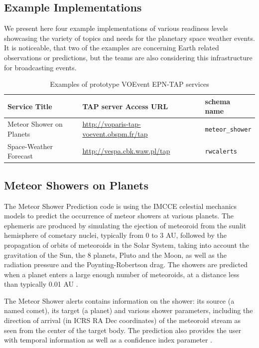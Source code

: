 \documentclass[referee,a4paper,12pt,traditabstract]{swsc}
\begin{document}
\begin{linenumbers}
\section{Example Implementations}

We present here four example implementations of various readiness levels showcasing the variety of topics and needs for the planetary space weather events. It is noticeable, that two of the examples are concerning Earth related observations or predictions, but the teams are also considering this infrastructure for broadcasting events.

\begin{table}
\begin{tabular}{lll}
Service Title&TAP server Access URL&schema name\\
\hline
Meteor Shower on Planets & \url{http://voparis-tap-voevent.obspm.fr/tap} & {\tt meteor\_shower}\\
Space-Weather Forecast & \url{http://vespa.cbk.waw.pl/tap} & {\tt rwcalerts}\\
\end{tabular}
\caption{Examples of prototype VOEvent EPN-TAP services}
\label{tab-services}
\end{table}

\subsection{Meteor Showers on Planets}
The Meteor Shower Prediction code is using the IMCCE celestial mechanics models to predict the occurrence of meteor showers at various planets. The ephemeris are produced by simulating the ejection of meteoroid from the sunlit hemisphere of cometary nuclei, typically from 0 to 3 AU, followed by the propagation of orbits of meteoroids in 
the Solar System, taking into account the gravitation of the Sun, the 8 planets, Pluto and the Moon, 
as well as the radiation pressure and the Poynting-Robertson drag. The showers are predicted when a 
 planet enters a large enough number of meteoroids, at a distance less than typically 0.01 AU \cite{2005A&A...439..751V, 2005A&A...439..761V}. 

The Meteor Shower alerts contains information on the shower: its source (a named comet), its target (a planet) and various shower parameters, including the direction of arrival (in ICRS RA Dec coordinates) of the meteoroid stream as seen from the center of the target body. The prediction also provides the user with temporal information as well as a confidence index parameter \cite{2017P&SS..143...78V}.


\end{linenumbers}
\end{document}
